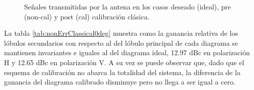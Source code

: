 \begin{figure}[H]
	\centering

		\caption{Señales transmitidas por la antena en los casos deseado (ideal), pre (non-cal) y post (cal) calibración clásica.}
	\label{fig:nonErrClassical0deg}
\end{figure}

La tabla \ref{tab:nonErrClassical0deg} muestra como la ganancia relativa de los lóbulos secundarios con respecto al del lóbulo
principal de cada diagrama se mantienen invariantes e iguales al del diagrama ideal, 12.97 dBc en polarización H y 12.65 dBc en
polarización V. A su vez se puede observar que, dado que el esquema de calibración no abarca la totalidad del sistema, la
diferencia de la ganancia del diagrama calibrado disminuye pero no llega a ser igual a cero.

